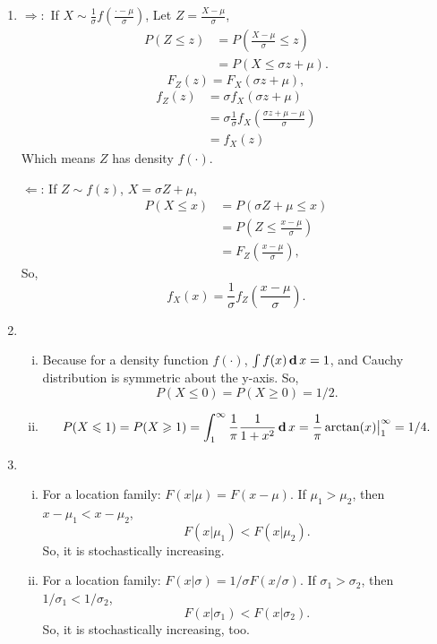 \begin{solution}
    \begin{enumerate}
        \item
        $\Rightarrow:$ If $X\sim\frac{1}{\sigma}f\left(\frac{\cdot-\mu}{\sigma}\right)$, Let $Z=\frac{X-\mu}{\sigma}$, 
        \begin{align*}
            P(Z\leqslant z)&=P\left(\frac{X-\mu}{\sigma}\leqslant z\right)\\
            &=P\left(X\leqslant\sigma z+\mu\right). 
        \end{align*}
        \[
            F_Z(z)=F_X(\sigma z+\mu), 
        \]
        \begin{align*}
            f_Z(z)&=\sigma f_X(\sigma z+\mu)\\
            &=\sigma \frac{1}{\sigma}f_X\left(\frac{\sigma z +\mu-\mu}{\sigma}\right)\\
            &=f_X(z)
        \end{align*}
        Which means $Z$ has density $f(\cdot)$. 

        $\Leftarrow$: If $Z\sim f(z)$, $X=\sigma Z+\mu$, 
        \begin{align*}
            P(X\leqslant x)&=P(\sigma Z+\mu\leqslant x)\\
            &=P(Z\leqslant\frac{x-\mu}{\sigma})\\
            &=F_Z\left(\frac{x-\mu}{\sigma}\right), 
        \end{align*}
        So, \[
            f_X(x)=\frac{1}{\sigma}f_Z\left(\frac{x-\mu}{\sigma}\right). 
        \]
        \item \begin{enumerate}[(i)]
            \item Because for a density function $f(\cdot)$, $\int f(x) \,\mathbf{d}\, x=1$, and Cauchy distribution is symmetric about the y-axis. So, 
            \[
                P(X\leqslant0)=P(X\geqslant0)=1/2. 
            \]
            \item \[
                P(X\leqslant1)=P(X\geqslant1)=\int_1^\infty\frac{1}{\pi}\frac{1}{1+x^2}\,\mathbf{d}\, x=\frac{1}{\pi}\arctan(x)\big|_1^\infty=1/4. 
            \]
        \end{enumerate}
        \item \begin{enumerate}[(i)]
            \item For a location family: $F(x|\mu)=F(x-\mu)$. If $\mu_1>\mu_2$, then $x-\mu_1<x-\mu_2$, 
            \[
                F(x|\mu_1)<F(x|\mu_2). 
            \]
            So, it is stochastically increasing. 
            \item For a location family: $F(x|\sigma)=1/\sigma F(x/\sigma)$. If $\sigma_1>\sigma_2$, then $1/\sigma_1<1/\sigma_2$, 
            \[
                F(x|\sigma_1)<F(x|\sigma_2). 
            \]
            So, it is stochastically increasing, too. 
        \end{enumerate}
    \end{enumerate}
\end{solution}

